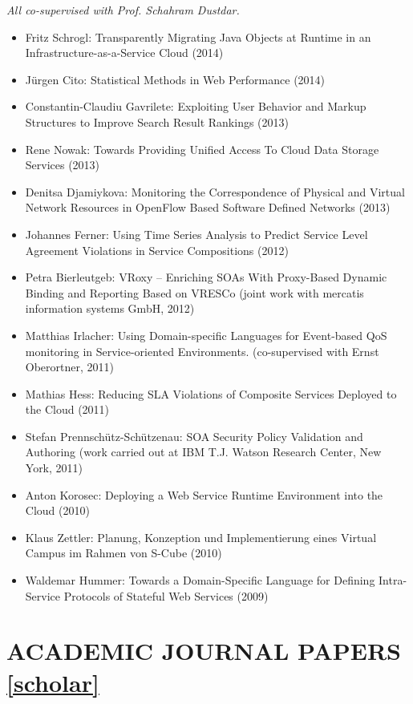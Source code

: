 \documentclass[paper=letter,fontsize=11pt]{scrartcl} %
\newcommand{\NewPart}[2]{\section*{\uppercase{#1} #2}}
\begin{document}
\emph{All co-supervised with Prof. Schahram Dustdar.}

\begin{itemize}
  \item Fritz Schrogl: Transparently Migrating Java Objects at Runtime in an Infrastructure-as-a-Service Cloud (2014)
  \item J\"urgen Cito: Statistical Methods in Web Performance (2014)
  \item Constantin-Claudiu Gavrilete: Exploiting User Behavior and Markup Structures to Improve Search Result Rankings (2013)
  \item Rene Nowak: Towards Providing Unified Access To Cloud Data Storage Services (2013)
  \item Denitsa Djamiykova: Monitoring the Correspondence of Physical and Virtual Network Resources in OpenFlow Based Software Defined Networks (2013)
  \item Johannes Ferner:  Using Time Series Analysis to Predict Service Level Agreement Violations in Service Compositions (2012)
\item Petra Bierleutgeb:  VRoxy -- Enriching SOAs With Proxy-Based Dynamic
  Binding and Reporting Based on VRESCo (joint work with mercatis information systems GmbH, 2012)
  \item Matthias Irlacher: Using Domain-specific Languages for Event-based QoS monitoring in Service-oriented Environments. (co-supervised with Ernst Oberortner, 2011)
  \item Mathias Hess:  Reducing SLA Violations of Composite Services Deployed to the Cloud (2011)
  \item Stefan Prennsch\"utz-Sch\"utzenau:  SOA Security Policy Validation and
  Authoring (work carried out at IBM T.J. Watson Research Center, New York, 2011)
    \item Anton Korosec:  Deploying a Web Service Runtime Environment into the
  Cloud (2010)
  \item Klaus Zettler:  Planung, Konzeption und Implementierung eines Virtual
  Campus im Rahmen von S-Cube (2010)
  \item Waldemar Hummer:  Towards a Domain-Specific Language for Defining
  Intra-Service Protocols of Stateful Web Services (2009)
\end{itemize}

\newpage


\NewPart{Academic Journal Papers}{\href{https://scholar.google.ch/citations?user=wZ9f8CAAAAAJ}{[scholar]}}
\end{document}
